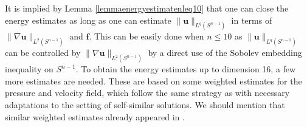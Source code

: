 \documentclass[12pt]{amsart}
\newtheorem{remark}{Remark}[section]
\renewcommand{\div}{{\rm div \thinspace }}
\newcommand{\Bu}{{\boldsymbol{u}}}
\newcommand{\Bf}{{\boldsymbol{f}}}
\begin{document}
	
	
	
	It is implied by Lemma \ref{lemmaenergyestimatenleq10} that one can close the energy estimates as long as one can estimate $\|\Bu\|_{L^q(S^{n-1})}$ in terms of $\|\nabla\Bu\|_{L^2(S^{n-1})}$ and $\Bf$.  This can be easily done when $n\leq 10$  as $\|\Bu\|_{L^q(S^{n-1})}$ can be controlled by $\|\nabla\Bu\|_{L^2(S^{n-1})}$ by a direct use of the Sobolev embedding inequality on $S^{n-1}$. To obtain the energy estimates up to dimension 16, a few more  estimates are needed. 
	These are based on some weighted estimates for the pressure and velocity field, which follow the same strategy as \cite[Lemmas 2.10 and 2.11]{LiYang22} with necessary adaptations to the setting of self-similar solutions. We should mention that similar weighted estimates already appeared in \cite{FrehseRuzicka94, FrehseRuzicka96}.
	
\end{document}
